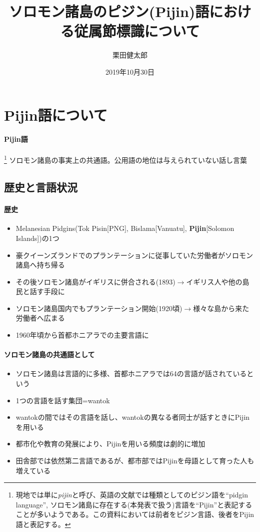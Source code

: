 \documentclass[11pt,a4paper]{jsarticle}
\title{\fontsize{16pt}{0pt}\selectfont ソロモン諸島のピジン(Pijin)語における従属節標識について}
\author{栗田健太郎}
\date{2019年10月30日}
\begin{document}
\maketitle
\section{Pijin語について}
\paragraph{Pijin語}\footnote{現地では単に\textit{pijin}と呼び、英語の文献では種類としてのピジン語を``pidgin language'', ソロモン諸島に存在する(本発表で扱う)言語を``Pijin''と表記することが多いようである。この資料においては前者をピジン言語、後者をPijin語と表記する。} ソロモン諸島の事実上の共通語。公用語の地位は与えられていない話し言葉

\subsection{歴史と言語状況}
\cite{phonology}
\paragraph{歴史}
\begin{itemize}
  \item Melanesian Pidgins(Tok Pisin[PNG], Bislama[Vanuatu], \textbf{Pijin}[Solomon Islands])の1つ
  \item 豪クイーンズランドでのプランテーションに従事していた労働者がソロモン諸島へ持ち帰る
  \item その後ソロモン諸島がイギリスに併合される(1893)$\rightarrow$イギリス人や他の島民と話す手段に
  \item ソロモン諸島国内でもプランテーション開始(1920頃)$\rightarrow$様々な島から来た労働者へ広まる
  \item 1960年頃から首都ホニアラでの主要言語に
\end{itemize}

\paragraph{ソロモン諸島の共通語として}
\begin{itemize}
  \item ソロモン諸島は言語的に多様、首都ホニアラでは64の言語が話されているという
  \item 1つの言語を話す集団=wantok
  \item wantokの間ではその言語を話し、wantokの異なる者同士が話すときにPijinを用いる
  \item 都市化や教育の発展により、Pijinを用いる頻度は劇的に増加
  \item 田舎部では依然第二言語であるが、都市部ではPijinを母語として育った人も増えている
\end{itemize}
\end{document}
